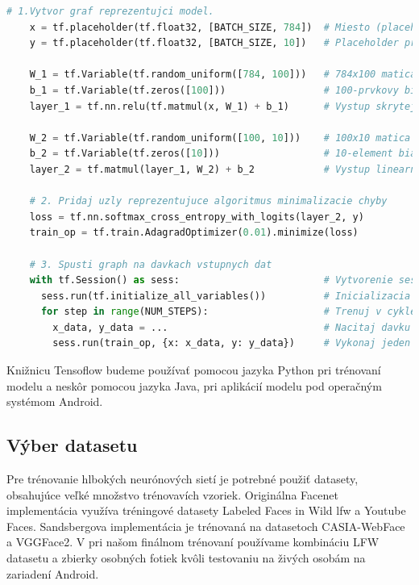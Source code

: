 \begin{lstlisting}[language=Python, label={fig:tfexample}, caption={Príklad klasifikácie pomocou Tensorflow}]
	# 1.Vytvor graf reprezentujci model.
	x = tf.placeholder(tf.float32, [BATCH_SIZE, 784])  # Miesto (placeholder) pre vstup.
	y = tf.placeholder(tf.float32, [BATCH_SIZE, 10])   # Placeholder pre triedy.
	
	W_1 = tf.Variable(tf.random_uniform([784, 100]))   # 784x100 matica vah.
	b_1 = tf.Variable(tf.zeros([100]))                 # 100-prvkovy bias vektor.
	layer_1 = tf.nn.relu(tf.matmul(x, W_1) + b_1)      # Vystup skrytej vrstvy.
	
	W_2 = tf.Variable(tf.random_uniform([100, 10]))    # 100x10 matica vah.
	b_2 = tf.Variable(tf.zeros([10]))                  # 10-element bias vector.
	layer_2 = tf.matmul(layer_1, W_2) + b_2            # Vystup linearnej vrstvy.
	
	# 2. Pridaj uzly reprezentujuce algoritmus minimalizacie chyby
	loss = tf.nn.softmax_cross_entropy_with_logits(layer_2, y)
	train_op = tf.train.AdagradOptimizer(0.01).minimize(loss)
	
	# 3. Spusti graph na davkach vstupnych dat
	with tf.Session() as sess:                         # Vytvorenie session.
	  sess.run(tf.initialize_all_variables())          # Inicializacia vah na nahodne hodnoty.
	  for step in range(NUM_STEPS):                    # Trenuj v cykle.
	    x_data, y_data = ...                           # Nacitaj davku vstupnych dat.
	    sess.run(train_op, {x: x_data, y: y_data})     # Vykonaj jeden treningovy cyklus.
\end{lstlisting}

\indent Knižnicu Tensoflow budeme používať pomocou jazyka Python pri trénovaní modelu a neskôr pomocou
jazyka Java, pri aplikácií modelu pod operačným systémom Android.

\subsection{Výber datasetu}
Pre trénovanie hlbokých neurónových sietí je potrebné použiť datasety, obsahujúce veľké množstvo trénovavích vzoriek.
Originálna Facenet implementácia \cite{schroff2015facenet} využíva tréningové datasety Labeled Faces in Wild \acrshort{lfw} a Youtube Faces.
Sandsbergova implementácia je trénovaná na datasetoch CASIA-WebFace a VGGFace2.
V pri našom finálnom trénovaní používame kombináciu LFW datasetu a zbierky osobných fotiek kvôli testovaniu na živých osobám na zariadení Android.

